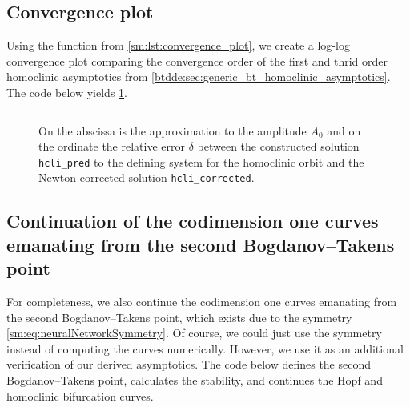 \subsection{Convergence plot}
Using the function from \cref{sm:lst:convergence_plot}, we create a log-log
convergence plot comparing the convergence order of the first and thrid order
homoclinic asymptotics from \cref{btdde:sec:generic_bt_homoclinic_asymptotics}.
The code below yields \cref{sm:fig:NeuralNetworkConvergencePlot}.
\inputminted[firstline=176, lastline=187]{MATLAB}{\pathToDDEBifToolDemos/neural_network_model/neural_network_model.m}
\begin{figure}[ht]
    \centering
        \caption{On the abscissa is the approximation to the amplitude $A_0$ and on
        the ordinate the relative error $\delta$ between the constructed solution
        \texttt{hcli_pred} to the defining system for the homoclinic orbit
        and the Newton corrected solution \texttt{hcli_corrected}.}
    \label{sm:fig:NeuralNetworkConvergencePlot}
\end{figure}

\subsection{Continuation of the codimension one curves emanating from the second Bogdanov--Takens point}
For completeness, we also continue the codimension one curves emanating from
the second Bogdanov--Takens point, which exists due to the symmetry
\cref{sm:eq:neuralNetworkSymmetry}. Of course, we could just use the symmetry
instead of computing the curves numerically. However, we use it as an
additional verification of our derived asymptotics. The code below defines the
second Bogdanov--Takens point, calculates the stability, and continues the Hopf
and homoclinic bifurcation curves.
\inputminted[firstline=189, lastline=216]{MATLAB}{\pathToDDEBifToolDemos/neural_network_model/neural_network_model.m}

